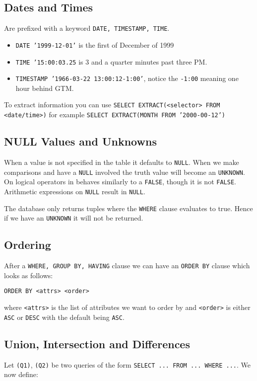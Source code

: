 \documentclass{sciposter}
\renewcommand{\t}[1]{\texttt{#1}}
\begin{document}
\begin{multicols}{3}
\subsection*{Dates and Times}
Are prefixed with a keyword \t{DATE, TIMESTAMP, TIME}.
\begin{itemize}
	\item \t{DATE '1999-12-01'} is the first of December of 1999
	\item \t{TIME '15:00:03.25} is 3 and a quarter minutes past three PM.
	\item \t{TIMESTAMP '1966-03-22 13:00:12-1:00'}, notice the \t{-1:00} meaning one hour behind GTM.
\end{itemize}

To extract information you can use \t{SELECT EXTRACT(<selector> FROM <date/time>)} for example \t{SELECT EXTRACT(MONTH FROM '2000-00-12')}


\subsection*{NULL Values and Unknowns}

When a value is not specified in the table it defaults to \t{NULL}.
When we make comparisons and have a \t{NULL} involved the truth value will become an \t{UNKNOWN}. On logical operators in behaves similarly to a \t{FALSE}, though it is not \t{FALSE}. Arithmetic expressions on \t{NULL} result in \t{NULL}.

The database only returns tuples where the \t{WHERE} clause evaluates to true. Hence if we have an \t{UNKNOWN} it will not be returned.


\subsection*{Ordering}

After a \t{WHERE, GROUP BY, HAVING} clause we can have an \t{ORDER BY} clause which looks as follows:

\t{ORDER BY <attrs> <order>}

where \t{<attrs>} is the list of attributes we want to order by and \t{<order>} is either \t{ASC} or \t{DESC} with the default being \t{ASC}.


\subsection*{Union, Intersection and Differences}

Let \t{(Q1)}, \t{(Q2)} be two queries of the form \t{SELECT ... FROM ... WHERE ...}. We now define: 


\end{multicols}
\end{document}
